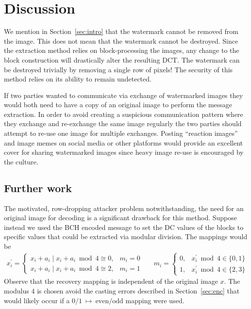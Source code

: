 \section{Discussion}\label{sec:discussion}

We mention in Section~\ref{sec:intro} that the watermark cannot be removed from the image.
This does not mean that the watermark cannot be destroyed.
Since the extraction method relies on block-processing the images, any change to the block construction will drastically alter the resulting DCT.
The watermark can be destroyed trivially by removing a single row of pixels!
The security of this method relies on its ability to remain undetected.

If two parties wanted to communicate via exchange of watermarked images they would both need to have a copy of an original image to perform the message extraction.
In order to avoid creating a suspicious communication pattern where they exchange and re-exchange the same image regularly the two parties should attempt to re-use one image for multiple exchanges.
Posting ``reaction images'' and image memes on social media or other platforms would provide an excellent cover for sharing watermarked images since heavy image re-use is encouraged by the culture.

\subsection{Further work}
The motivated, row-dropping attacker problem notwithstanding, the need for an original image for decoding is a significant drawback for this method.
Suppose instead we used the BCH encoded message to set the DC values of the blocks to specific values that could be extracted via modular division.
The mappings would be
\begin{align*}
x^{\prime}_i = \begin{cases}
x_i + a_i \mid x_i + a_i \bmod 4 \cong 0, & m_i = 0 \\
x_i + a_i \mid x_i + a_i \bmod 4 \cong 2, & m_i = 1
\end{cases}
&&
m_i = \begin{cases}
0, & x^{\prime}_i \bmod 4 \in \{0, 1\} \\
1, & x^{\prime}_i \bmod 4 \in \{2, 3\}
\end{cases}
\end{align*}
Observe that the recovery mapping is independent of the original image $x$.
The modulus 4 is chosen avoid the casting errors described in Section~\ref{sec:enc} that would likely occur if a $0/1~\mapsto~\text{even}/\text{odd}$ mapping were used.
